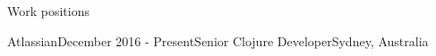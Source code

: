 \documentclass{resume} %
\begin{document}
\begin{rSection}{Work positions}
\begin{rSubsection}{Atlassian}{December 2016 - Present}{Senior Clojure Developer}{Sydney, Australia}
~
\end{rSubsection}


\end{rSection}
\end{document}
